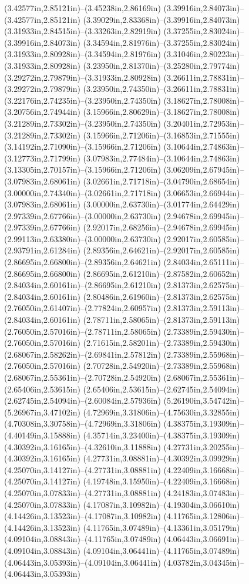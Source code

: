 (3.42577in,2.85121in)--(3.45238in,2.86169in) (3.39916in,2.84073in)--(3.42577in,2.85121in) (3.39029in,2.83368in)--(3.39916in,2.84073in) (3.31933in,2.84515in)--(3.33263in,2.82919in) (3.37255in,2.83024in)--(3.39916in,2.84073in) (3.34594in,2.81976in)--(3.37255in,2.83024in) (3.31933in,2.80928in)--(3.34594in,2.81976in) (3.31046in,2.80223in)--(3.31933in,2.80928in) (3.23950in,2.81370in)--(3.25280in,2.79774in) (3.29272in,2.79879in)--(3.31933in,2.80928in) (3.26611in,2.78831in)--(3.29272in,2.79879in) (3.23950in,2.74350in)--(3.26611in,2.78831in) (3.22176in,2.74235in)--(3.23950in,2.74350in) (3.18627in,2.78008in)--(3.20756in,2.74944in) (3.15966in,2.80629in)--(3.18627in,2.78008in) (3.21289in,2.73302in)--(3.23950in,2.74350in) (3.20401in,2.72953in)--(3.21289in,2.73302in) (3.15966in,2.71206in)--(3.16853in,2.71555in) (3.14192in,2.71090in)--(3.15966in,2.71206in) (3.10644in,2.74863in)--(3.12773in,2.71799in) (3.07983in,2.77484in)--(3.10644in,2.74863in) (3.13305in,2.70157in)--(3.15966in,2.71206in) (3.06209in,2.67945in)--(3.07983in,2.68061in) (3.02661in,2.71718in)--(3.04790in,2.68654in) (3.00000in,2.74340in)--(3.02661in,2.71718in) (3.06653in,2.66944in)--(3.07983in,2.68061in) (3.00000in,2.63730in)--(3.01774in,2.64429in) (2.97339in,2.67766in)--(3.00000in,2.63730in) (2.94678in,2.69945in)--(2.97339in,2.67766in) (2.92017in,2.68256in)--(2.94678in,2.69945in) (2.99113in,2.63380in)--(3.00000in,2.63730in) (2.92017in,2.60585in)--(2.93791in,2.61284in) (2.89356in,2.64621in)--(2.92017in,2.60585in) (2.86695in,2.66800in)--(2.89356in,2.64621in) (2.84034in,2.65111in)--(2.86695in,2.66800in) (2.86695in,2.61210in)--(2.87582in,2.60652in) (2.84034in,2.60161in)--(2.86695in,2.61210in) (2.81373in,2.62575in)--(2.84034in,2.60161in) (2.80486in,2.61960in)--(2.81373in,2.62575in) (2.76050in,2.61407in)--(2.77824in,2.60957in) (2.81373in,2.59113in)--(2.84034in,2.60161in) (2.78711in,2.58065in)--(2.81373in,2.59113in) (2.76050in,2.57016in)--(2.78711in,2.58065in) (2.73389in,2.59430in)--(2.76050in,2.57016in) (2.71615in,2.58201in)--(2.73389in,2.59430in) (2.68067in,2.58262in)--(2.69841in,2.57812in) (2.73389in,2.55968in)--(2.76050in,2.57016in) (2.70728in,2.54920in)--(2.73389in,2.55968in) (2.68067in,2.55361in)--(2.70728in,2.54920in) (2.68067in,2.55361in)--(2.65406in,2.53615in) (2.65406in,2.53615in)--(2.62745in,2.54094in) (2.62745in,2.54094in)--(2.60084in,2.57936in) (5.26190in,3.54742in)--(5.26967in,3.47102in) (4.72969in,3.31806in)--(4.75630in,3.32855in) (4.70308in,3.30758in)--(4.72969in,3.31806in) (4.38375in,3.19309in)--(4.40149in,3.15888in) (4.35714in,3.23400in)--(4.38375in,3.19309in) (4.30392in,3.16165in)--(4.32610in,3.11888in) (4.27731in,3.20255in)--(4.30392in,3.16165in) (4.27731in,3.08881in)--(4.30392in,3.09929in) (4.25070in,3.14127in)--(4.27731in,3.08881in) (4.22409in,3.16668in)--(4.25070in,3.14127in) (4.19748in,3.15950in)--(4.22409in,3.16668in) (4.25070in,3.07833in)--(4.27731in,3.08881in) (4.24183in,3.07483in)--(4.25070in,3.07833in) (4.17087in,3.10982in)--(4.19304in,3.06610in) (4.14426in,3.13523in)--(4.17087in,3.10982in) (4.11765in,3.12806in)--(4.14426in,3.13523in) (4.11765in,3.07489in)--(4.13361in,3.05179in) (4.09104in,3.08843in)--(4.11765in,3.07489in) (4.06443in,3.06691in)--(4.09104in,3.08843in) (4.09104in,3.06441in)--(4.11765in,3.07489in) (4.06443in,3.05393in)--(4.09104in,3.06441in) (4.03782in,3.04345in)--(4.06443in,3.05393in) 